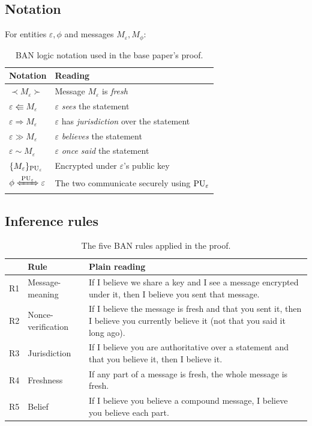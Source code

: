 \subsection{Notation}

For entities $\varepsilon, \phi$ and messages $M_\varepsilon, M_\phi$:

\begin{table}[H]
\centering
\small
\caption{BAN logic notation used in the base paper's proof.}
\label{tab:ban-not}
\begin{tabularx}{\textwidth}{@{}L{30mm} X@{}}
\toprule
\textbf{Notation} & \textbf{Reading}\\
\midrule
$\prec M_\varepsilon \succ$ & Message $M_\varepsilon$ is \emph{fresh}\\
$\varepsilon \Lleftarrow M_\varepsilon$ & $\varepsilon$ \emph{sees} the statement\\
$\varepsilon \Rightarrow M_\varepsilon$ & $\varepsilon$ has \emph{jurisdiction} over the statement\\
$\varepsilon \gg M_\varepsilon$ & $\varepsilon$ \emph{believes} the statement\\
$\varepsilon \sim M_\varepsilon$ & $\varepsilon$ \emph{once said} the statement\\
$\{M_\varepsilon\}_{\mathrm{PU}_\varepsilon}$ & Encrypted under $\varepsilon$'s public key\\
$\phi \xLeftrightarrow{\PU_\varepsilon} \varepsilon$ & The two communicate securely using $\mathrm{PU}_\varepsilon$\\
\bottomrule
\end{tabularx}
\end{table}

\subsection{Inference rules}

\begin{table}[H]
\centering
\small
\caption{The five BAN rules applied in the proof.}
\label{tab:ban-rules}
\begin{tabularx}{\textwidth}{@{}L{10mm} L{40mm} X@{}}
\toprule
& \textbf{Rule} & \textbf{Plain reading}\\
\midrule
R1 & Message-meaning &
  If I believe we share a key and I see a message encrypted under it, then I believe you
  sent that message.\\
R2 & Nonce-verification &
  If I believe the message is fresh and that you sent it, then I believe you currently
  believe it (not that you said it long ago).\\
R3 & Jurisdiction &
  If I believe you are authoritative over a statement and that you believe it, then I
  believe it.\\
R4 & Freshness &
  If any part of a message is fresh, the whole message is fresh.\\
R5 & Belief &
  If I believe you believe a compound message, I believe you believe each part.\\
\bottomrule
\end{tabularx}
\end{table}

